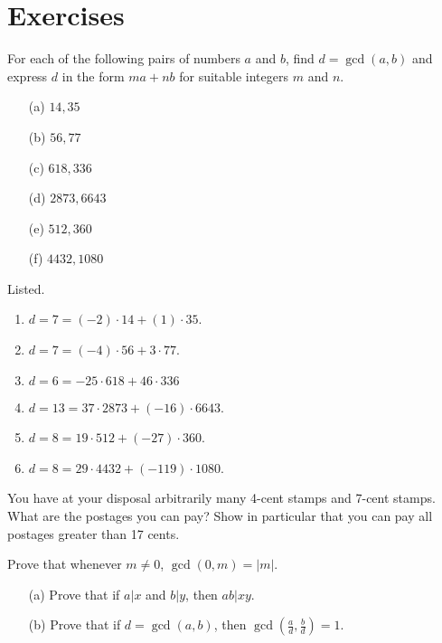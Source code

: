 \section{Exercises}

  \begin{exercise}[Shifrin 1.2.1]
    For each of the following pairs of numbers $a$ and $b$, find $d = \gcd(a,b)$ and express $d$ in the form $ma+nb$ for suitable integers $m$ and $n$.
    \begin{enumerate}
      \item[(a)] $14, 35$
      \item[(b)] $56, 77$
      \item[(c)] $618, 336$
      \item[(d)] $2873, 6643$
      \item[(e)] $512, 360$
      \item[(f)] $4432, 1080$
    \end{enumerate}
  \end{exercise}
  \begin{solution}
    Listed. 
    \begin{enumerate}
      \item $d = 7 = (-2) \cdot 14 + (1) \cdot 35$. 
      \item $d = 7 = (-4) \cdot 56 + 3 \cdot 77$. 
      \item $d = 6 = -25 \cdot 618 + 46 \cdot 336$ 
      \item $d = 13 = 37 \cdot 2873 + (-16) \cdot 6643$. 
      \item $d = 8 = 19 \cdot 512 + (-27) \cdot 360$. 
      \item $d = 8 = 29 \cdot 4432 + (-119) \cdot 1080$. 
    \end{enumerate}
  \end{solution}

  \begin{exercise}[Shifrin 1.2.2]
    You have at your disposal arbitrarily many 4-cent stamps and 7-cent stamps. What are the postages you can pay? Show in particular that you can pay all postages greater than 17 cents.
  \end{exercise}

  \begin{exercise}[Shifrin 1.2.3]
    Prove that whenever $m \neq 0$, $\gcd(0, m) = |m|$.
  \end{exercise}

  \begin{exercise}[Shifrin 1.2.4]
    \begin{enumerate}
      \item[(a)] Prove that if $a|x$ and $b|y$, then $ab|xy$.
      \item[(b)] Prove that if $d = \gcd(a, b)$, then $\gcd(\frac{a}{d}, \frac{b}{d}) = 1$.
    \end{enumerate}
  \end{exercise}

